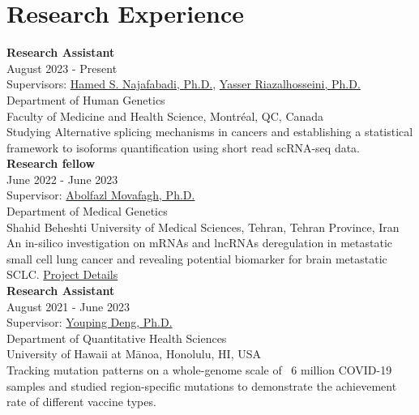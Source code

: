 \documentclass[a4paper,9pt]{extarticle}
\begin{document}
\section*{Research Experience}
\noindent
\newline
\textbf{Research Assistant} \\
August 2023 - Present \\
Supervisors: \href{https://scholar.google.com/citations?user=7RluIhUAAAAJ&hl=en}{Hamed S. Najafabadi, Ph.D.},  \href{https://scholar.google.com/citations?user=nTabYNcAAAAJ}{Yasser Riazalhosseini, Ph.D.}\\
Department of Human Genetics \\
Faculty of Medicine and Health Science, Montréal, QC, Canada \\ 
Studying Alternative splicing mechanisms in cancers and establishing a statistical framework to isoforms quantification using short read scRNA-seq data. \\ 


\noindent
\textbf{Research fellow} \\
June 2022 - June 2023 \\
Supervisor: \href{https://scholar.google.com/citations?user=o2NAtDIAAAAJ&hl=en}{Abolfazl Movafagh, Ph.D.}\\
Department of Medical Genetics \\
Shahid Beheshti University of Medical Sciences, Tehran, Tehran Province, Iran \\ 
An in-silico investigation on mRNAs and lncRNAs deregulation in metastatic small cell lung cancer and revealing potential biomarker for brain metastatic SCLC. \href{https://drive.google.com/file/d/1HORJcyF-bwOsYw6FeWyZysfa3_7bd7uB/view}{Project Details} \\ 



\noindent
\textbf{Research Assistant} \\
August 2021 - June 2023  \\
Supervisor: \href{https://scholar.google.com/citations?hl=en&user=TA6BGwcAAAAJ}{Youping Deng, Ph.D.} \\
Department of Quantitative Health Sciences \\
University of Hawaii at Mānoa, Honolulu, HI, USA \\ 
Tracking mutation patterns on a whole-genome scale of ~6 million COVID-19 samples and studied region-specific mutations to demonstrate the achievement rate of different vaccine types. \\
\end{document}
